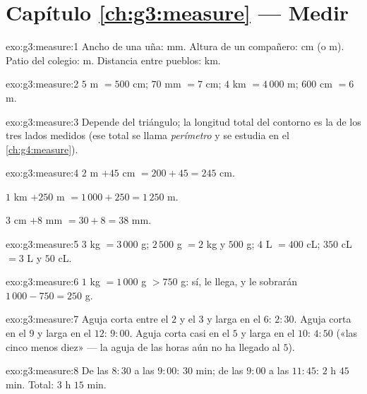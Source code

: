 \section*{Capítulo \ref{ch:g3:measure} --- Medir}

\begin{solution}{exo:g3:measure:1}
Ancho de una uña: mm. Altura de un compañero: cm (o m). Patio del colegio: m.
Distancia entre pueblos: km.
\end{solution}

\begin{solution}{exo:g3:measure:2}
$5$ m $= 500$ cm; \quad $70$ mm $= 7$ cm; \quad
$4$ km $= 4\,000$ m; \quad $600$ cm $= 6$ m.
\end{solution}

\begin{solution}{exo:g3:measure:3}
Depende del triángulo; la longitud total del contorno es la
 de los tres lados medidos (ese total se llama
\emph{perímetro} y se estudia en el \cref{ch:g4:measure}).
\end{solution}

\begin{solution}{exo:g3:measure:4}
$2$ m $+ 45$ cm $= 200 + 45 = 245$ cm.

$1$ km $+ 250$ m $= 1\,000 + 250 = 1\,250$ m.

$3$ cm $+ 8$ mm $= 30 + 8 = 38$ mm.
\end{solution}

\begin{solution}{exo:g3:measure:5}
$3$ kg $= 3\,000$ g; \quad $2\,500$ g $= 2$ kg y $500$ g; \quad
$4$ L $= 400$ cL; \quad $350$ cL $= 3$ L y $50$ cL.
\end{solution}

\begin{solution}{exo:g3:measure:6}
$1$ kg $= 1\,000$ g $> 750$ g: sí, le llega, y le sobrarán
$1\,000 - 750 = 250$ g.
\end{solution}

\begin{solution}{exo:g3:measure:7}
Aguja corta entre el $2$ y el $3$ y larga en el $6$: $2{:}30$.
Aguja corta en el $9$ y larga en el $12$: $9{:}00$. Aguja corta casi en
el $5$ y larga en el $10$: $4{:}50$ («las cinco menos diez» --- la aguja de las horas
aún no ha llegado al $5$).
\end{solution}

\begin{solution}{exo:g3:measure:8}
De las $8{:}30$ a las $9{:}00$: $30$ min; de las $9{:}00$ a las $11{:}45$:
$2$ h $45$ min. Total: $3$ h $15$ min.
\end{solution}

